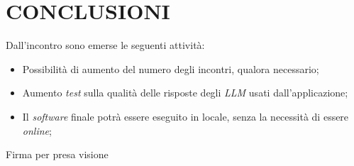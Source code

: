 \documentclass[5pt]{article}
\begin{document}
\section{CONCLUSIONI}
Dall'incontro sono emerse le seguenti attività: 
\begin{itemize}
    \item Possibilità di aumento del numero degli incontri, qualora necessario;
    \item Aumento \textit{test} sulla qualità delle risposte degli \textit{LLM} usati dall'applicazione;
    \item Il \textit{software} finale potrà essere eseguito in locale, senza la necessità di essere \textit{online};
\end{itemize}

\vspace{3em}
\begin{flushright}
	\begin{spacing}{1.5}
		Firma per presa visione\\
	\end{spacing}
\end{flushright}
\end{document}
